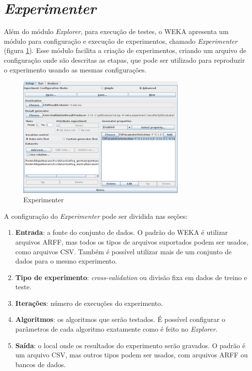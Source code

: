 \section{\emph{Experimenter}}

Além do módulo \emph{Explorer}, para execução de testes, o WEKA apresenta um módulo para configuração e execução de experimentos, chamado \emph{Experimenter} (figura \ref{fig:dev_weka_experimenter}). Esse módulo facilita a criação de experimentos, criando um arquivo de configuração onde são descritas as etapas, que pode ser utilizado para reproduzir o experimento usando as mesmas configurações.

\begin{figure}[h!]
    \vspace{0.5cm}
    \centering
    \caption{Experimenter}
    \label{fig:dev_weka_experimenter}
    \vspace{0.5cm}
    \includegraphics[width=0.75\textwidth]{img/experimenter.png}
    \vspace{0.5cm}
    \vspace{0.5cm}
\end{figure}

A configuração do \emph{Experimenter} pode ser dividida nas seções:

\begin{enumerate}
    \item \textbf{Entrada}: a fonte do conjunto de dados. O padrão do WEKA é utilizar arquivos ARFF, mas todos os tipos de arquivos suportados podem ser usados, como arquivos CSV. Também é possível utilizar mais de um conjunto de dados para o mesmo experimento.
    \item \textbf{Tipo de experimento}: \emph{cross-validation} ou divisão fixa em dados de treino e teste.
    \item \textbf{Iterações}: número de execuções do experimento.
    \item \textbf{Algoritmos}: os algoritmos que serão testados. É possível configurar o parâmetros de cada algoritmo exatamente como é feito no \emph{Explorer}.
    \item \textbf{Saída}: o local onde os resultados do experimento serão gravados. O padrão é um arquivo CSV, mas outros tipos podem ser usados, com arquivos ARFF ou bancos de dados.
\end{enumerate}

